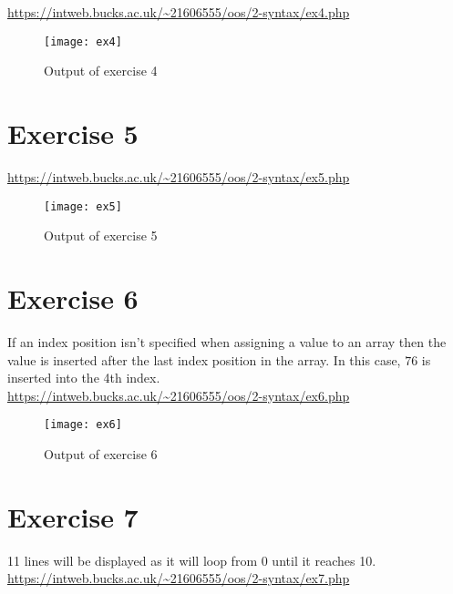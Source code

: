 \url{https://intweb.bucks.ac.uk/~21606555/oos/2-syntax/ex4.php}
\captionsetup{type=figure}


\begin{figure}[H]
  \caption{Output of exercise 4}
  \centering
  \texttt{[image: ex4]}
\end{figure}

\clearpage
\section{Exercise 5}

\url{https://intweb.bucks.ac.uk/~21606555/oos/2-syntax/ex5.php}
\captionsetup{type=figure}


\begin{figure}[H]
  \caption{Output of exercise 5}
  \centering
  \texttt{[image: ex5]}
\end{figure}

\clearpage
\section{Exercise 6}

If an index position isn't specified when assigning a value to an array then the value is inserted after the last index position in the array. In this case, $76$ is inserted into the 4th index.\\

\url{https://intweb.bucks.ac.uk/~21606555/oos/2-syntax/ex6.php}
\captionsetup{type=figure}


\begin{figure}[H]
  \caption{Output of exercise 6}
  \centering
  \texttt{[image: ex6]}
\end{figure}

\clearpage
\section{Exercise 7}

11 lines will be displayed as it will loop from 0 until it reaches 10.\\

\url{https://intweb.bucks.ac.uk/~21606555/oos/2-syntax/ex7.php}
\captionsetup{type=figure}


